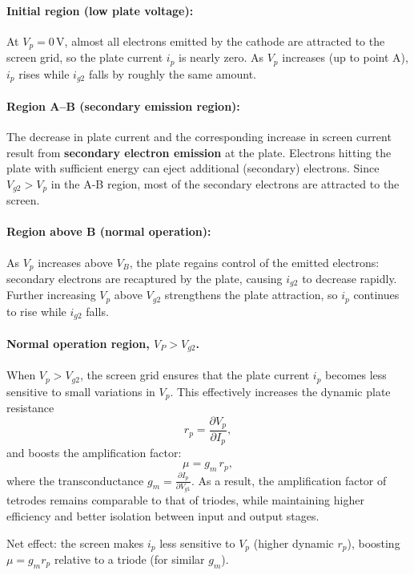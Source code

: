 \paragraph{Initial region (low plate voltage):}
At $V_p = 0\,\mathrm{V}$, almost all electrons emitted by the cathode are attracted to the screen grid, so the plate current $i_p$ is nearly zero.  
As $V_p$ increases (up to point A), $i_p$ rises while $i_{g2}$ falls by roughly the same amount.

\paragraph{Region A–B (secondary emission region): }
The decrease in plate current and the corresponding increase in screen current result from \textbf{secondary electron emission} at the plate.  
Electrons hitting the plate with sufficient energy can eject additional (secondary) electrons.  
Since $V_{g2} > V_p$ in the A-B region, most of the secondary electrons are attracted to the screen.

\paragraph{Region above B (normal operation): }
As $V_p$ increases above $V_B$, the plate regains control of the emitted electrons: secondary electrons are recaptured by the plate, causing $i_{g2}$ to decrease rapidly.  
Further increasing $V_p$ above $V_{g2}$ strengthens the plate attraction, so $i_p$ continues to rise while $i_{g2}$ falls.

\paragraph{Normal operation region, $V_P>V_{g2}$.}
When $V_p > V_{g2}$, the screen grid ensures that the plate current $i_p$ becomes less sensitive to small variations in $V_p$.  
This effectively increases the dynamic plate resistance
\[
r_p = \frac{\partial V_p}{\partial I_p},
\]
and boosts the amplification factor:
\[
\mu = g_m \, r_p,
\]
where the transconductance $g_m = \frac{\partial I_p}{\partial V_{g1}}$.  
As a result, the amplification factor of tetrodes remains comparable to that of triodes, while maintaining higher efficiency and better isolation between input and output stages.



Net effect: the screen makes $i_p$ less sensitive to $V_p$ (higher dynamic $r_p$), boosting $\mu=g_m r_p$ relative to a triode (for similar $g_m$).



